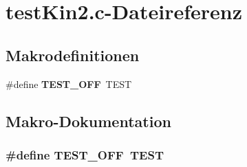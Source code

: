 \section{testKin2.c-\/Dateireferenz}
\label{test_kin2_8c}
\subsection*{Makrodefinitionen}
\begin{DoxyCompactItemize}
\item 
\#define {\bf TEST\_\-OFF}~TEST
\end{DoxyCompactItemize}


\subsection{Makro-\/Dokumentation}
\subsubsection[{TEST\_\-OFF}]{\setlength{\rightskip}{0pt plus 5cm}\#define TEST\_\-OFF~TEST}\label{test_kin2_8c_a8f6764e8e57eabbb14922404c0e25175}
